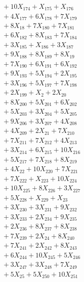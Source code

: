 \documentclass[a4paper,10pt]{article}
\begin{document}
{\begin{align}
&\quad  + 10X_{174} + X_{175} + X_{176} \\[0.5ex]
&\quad  + 4X_{177} + 6X_{178} + 7X_{179} \\[0.5ex]
&\quad  + 8X_{18} + 7X_{180} + 7X_{181} \\[0.5ex]
&\quad  + 6X_{182} + 8X_{183} + 7X_{184} \\[0.5ex]
&\quad  + 3X_{185} + X_{186} + 3X_{187} \\[0.5ex]
&\quad  + 9X_{188} + 8X_{189} + 8X_{19} \\[0.5ex]
&\quad  + 7X_{190} + 6X_{191} + 6X_{192} \\[0.5ex]
&\quad  + 9X_{193} + 5X_{194} + 2X_{195} \\[0.5ex]
&\quad  + 3X_{196} + 5X_{197} + 7X_{198} \\[0.5ex]
&\quad  + 2X_{199} + X_{2} + 2X_{20} \\[0.5ex]
&\quad  + 8X_{200} + 5X_{201} + 6X_{202} \\[0.5ex]
&\quad  + 5X_{203} + 3X_{204} + 5X_{205} \\[0.5ex]
&\quad  + 9X_{206} + 3X_{207} + 4X_{208} \\[0.5ex]
&\quad  + 4X_{209} + 2X_{21} + 7X_{210} \\[0.5ex]
&\quad  + 7X_{211} + 7X_{212} + 4X_{213} \\[0.5ex]
&\quad  + 3X_{214} + 6X_{215} + 10X_{216} \\[0.5ex]
&\quad  + 5X_{217} + 7X_{218} + 8X_{219} \\[0.5ex]
&\quad  + 4X_{22} + 10X_{220} + 7X_{221} \\[0.5ex]
&\quad  + 7X_{222} + X_{223} + 10X_{224} \\[0.5ex]
&\quad  + 10X_{225} + 8X_{226} + 3X_{227} \\[0.5ex]
&\quad  + 5X_{228} + X_{229} + X_{23} \\[0.5ex]
&\quad  + 3X_{230} + 3X_{231} + 9X_{232} \\[0.5ex]
&\quad  + 3X_{233} + 2X_{234} + 9X_{235} \\[0.5ex]
&\quad  + 2X_{236} + 8X_{237} + 8X_{238} \\[0.5ex]
&\quad  + 7X_{239} + 2X_{24} + 8X_{240} \\[0.5ex]
&\quad  + 7X_{241} + 2X_{242} + 8X_{243} \\[0.5ex]
&\quad  + 6X_{244} + 10X_{245} + 5X_{246} \\[0.5ex]
&\quad  + 3X_{247} + 3X_{248} + 7X_{249} \\[0.5ex]
&\quad  + 5X_{25} + 5X_{250} + 10X_{251} \\[0.5ex]

\end{align}}
\end{document}
